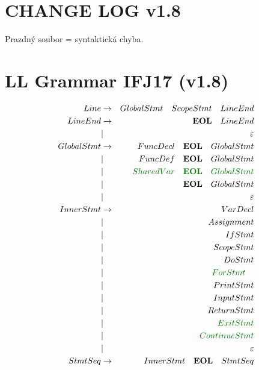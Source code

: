 \documentclass[a4paper,11pt,landscape,leqno]{article}
\begin{document}
\section{CHANGE LOG v1.8}
Prazdný soubor = syntaktická chyba.
\section{LL Grammar IFJ17 (v1.8)}
\begin{eqnarray}
Line		&	\rightarrow		& GlobalStmt\quad ScopeStmt\quad  LineEnd	 \\
LineEnd		& \rightarrow		& \textbf{EOL}\quad LineEnd\\
			&		|			& \varepsilon		  \\
GlobalStmt	&	\rightarrow		&  FuncDecl\quad \textbf{EOL}\quad GlobalStmt	 \\
			&		|			& FuncDef\quad \textbf{EOL}\quad GlobalStmt    \\
			&		|			& \textcolor{green1}{SharedVar\quad \textbf{EOL}\quad GlobalStmt}	 \\
			&		|			& \textbf{EOL}\quad GlobalStmt\\
			&		|			& \varepsilon \\
InnerStmt	&	\rightarrow		& VarDecl  \\
			&		|			& Assignment	\\
			&		|			& IfStmt	\\
			&		|			& ScopeStmt   \\
			&		|			& DoStmt  \\
			&		|			& \textcolor{green1}{ForStmt}\quad	\\
			&		|			& PrintStmt \\
			&		|			& InputStmt  \\
			&		|			& ReturnStmt  \\
			&		|			& \textcolor{green1}{ExitStmt}	\\
			&		|			& \textcolor{green1}{ContinueStmt}	\\
			&		|			& \varepsilon \\
StmtSeq		&	 \rightarrow	& InnerStmt\quad \textbf{EOL}\quad StmtSeq	 \\

\end{eqnarray}
\end{document}
